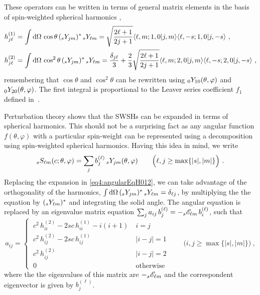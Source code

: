 These operators can be written in terms of general matrix elements in the basis of spin-weighted spherical harmonics \cite{TorresdelCastillo2003},
\begin{align}
	\begin{split}
	h^{(1)}_{j\ell} &= \int \dd\Omega \,\cos\theta \,(\uu[s]{Y}{j m})^* \,\uu[s]{Y}{\ell m} = \sqrt{\frac{2 \ell+1}{2 j+1}} \langle \ell,m; 1,0 | j,m \rangle \langle \ell, -s; 1,0 | j, -s \rangle ~, \\
	h^{(2)}_{j\ell} &= \int \dd\Omega \,\cos^2\theta \,(\uu[s]{Y}{j m})^* \,\uu[s]{Y}{\ell m} = \frac{\delta_{j\ell}}{3} + \frac{2}{3}\sqrt{\frac{2 \ell+1}{2 j+1}} \langle \ell,m; 2,0 | j,m \rangle \langle \ell, -s; 2,0 | j, -s \rangle ~,
	\end{split}
\end{align}
remembering that $\cos\theta$ and $\cos^2\theta$ can be rewritten using $\uu[0]{Y}{10}(\theta,\varphi)$ and $\uu[0]{Y}{20}(\theta,\varphi)$.
The first integral is proportional to the Leaver series coefficient $f_1$ defined in~.

Perturbation theory shows that the SWSHs can be expanded in terms of spherical harmonics.
This should not be a surprising fact as any angular function $f(\theta,\varphi)$ with a particular spin-weight can be represented using a decomposition using spin-weighted spherical harmonics.
Having this idea in mind, we write 
\begin{align}
	\label{eq4:SWSHsphericalExpansion}
	\uu[s]{S}{\ell m}(c; \theta, \varphi) = \sum_{j} b_{j}^{(\ell)} \,\uu[s]{Y}{j m}(\theta,\varphi) \qquad \Big( \ell, j \ge \max\{|s|,|m|\} \Big) ~.
\end{align}
Replacing the expansion in \eqref{eq4:angularEqH012}, we can take advantage of the orthogonality of the harmonics, $\int \dd\Omega \,(\uu[s]{Y}{j m})^* \,\uu[s]{Y}{\ell m} = \delta_{\ell j}$, by multiplying the the equation by $(\uu[s]{Y}{\ell m})^*$ and integrating the solid angle.
The angular equation is replaced by an eigenvalue matrix equation $\sum_{j} a_{ij} \, b_{j}^{(\ell)} = - \uu[s]{\mathscr{E}}{\ell m} \,b_{i}^{(\ell)}$, such that
\begin{equation}
	\label{eq4:spectralMatrix}
	a_{ij} =
	\begin{cases} 
		~c^2 \,h^{(2)}_{ii} - 2 s c \,h^{(1)}_{ii} - i(i+1) & ~ i=j \\[-0.5ex]
		~c^2 \,h^{(2)}_{ij} - 2 s c \,h^{(1)}_{ij} & ~ |i-j|=1 \\[-0.5ex]
		~c^2 \,h^{(2)}_{ij} & ~ |i-j|=2 \\[-0.5ex]
		~0 & ~\text{otherwise}
	\end{cases}  \qquad \Big( i, j \ge \max\{|s|,|m|\} \Big) ~,
\end{equation}
where the the eigenvalues of this matrix are $-\uu[s]{\mathscr{E}}{\ell m}$ and the correspondent eigenvector is given by $b_j^{(\ell)}$.

